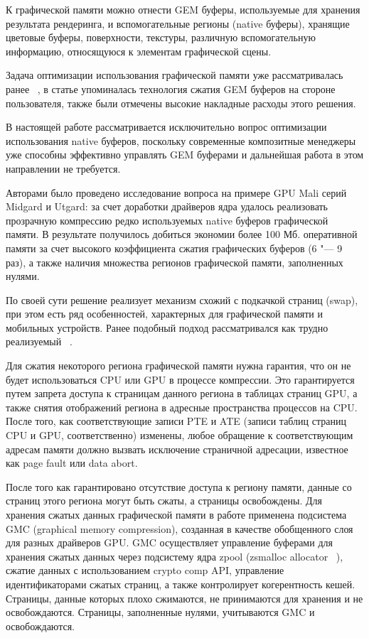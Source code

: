 \documentclass[10pt, a5paper]{article}
\begin{document}
К графической памяти можно отнести GEM буферы, используемые для хранения результата рендеринга, и вспомогательные регионы (native буферы), хранящие цветовые буферы, поверхности, текстуры, различную вспомогательную информацию, относящуюся к элементам графической сцены.

Задача оптимизации использования графической памяти уже рассматривалась ранее ~\cite{Rogachev1}, в статье упоминалась технология сжатия GEM буферов на стороне пользователя, также были отмечены высокие накладные расходы этого решения.

В настоящей работе рассматривается исключительно вопрос оптимизации использования native буферов, поскольку современные композитные менеджеры уже способны эффективно управлять \linebreak GEM буферами и дальнейшая работа в этом направлении не требуется.

Авторами было проведено исследование вопроса на примере \linebreak GPU Mali серий Midgard и Utgard: за счет доработки драйверов ядра удалось реализовать прозрачную компрессию редко используемых native буферов графической памяти. В результате получилось добиться экономии более 100 Мб. оперативной памяти за счет высокого коэффициента сжатия графических буферов (6 "--- 9 раз), а также наличия множества регионов графической памяти, заполненных нулями.

По своей сути решение реализует механизм схожий с подкачкой страниц (swap), при этом есть ряд особенностей, характерных для графической памяти и мобильных устройств. Ранее подобный подход рассматривался как трудно реализуемый ~\cite{Rogachev2}.

Для сжатия некоторого региона графической памяти нужна гарантия, что он не будет использоваться CPU или GPU в процессе компрессии. Это гарантируется путем запрета доступа к страницам данного региона в таблицах страниц GPU, а также снятия отображений региона в адресные пространства процессов на CPU. После того, как соответствующие записи PTE и ATE (записи таблиц страниц CPU и GPU, соответственно) изменены, любое обращение к соответствующим адресам памяти должно вызвать исключение страничной адресации, известное как page fault или data abort.

После того как гарантировано отсутствие доступа к региону памяти, данные со страниц этого региона могут быть сжаты, а страницы освобождены. Для хранения сжатых данных графической памяти в работе применена подсистема GMC (graphical memory compression), созданная в качестве обобщенного слоя для разных драйверов GPU. GMC осуществляет управление буферами для хранения сжатых данных через подсистему ядра zpool (zsmalloc \linebreak allocator ~\cite{Rogachev3}), сжатие данных с использованием crypto comp API, управление идентификаторами сжатых страниц, а также контролирует когерентность кешей. Страницы, данные которых плохо сжимаются, не принимаются для хранения и не освобождаются. Страницы, заполненные нулями, учитываются GMC и освобождаются.
\end{document}
